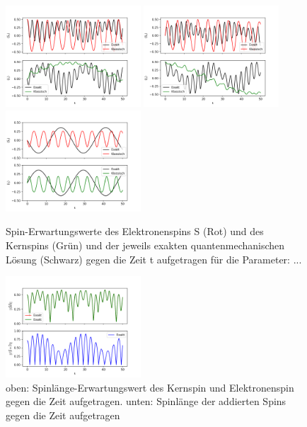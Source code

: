 \begin{figure}[h]
    \centering
    \includegraphics[width = 0.45\textwidth]{Abbildungen/Plot_Sx.png}
    \includegraphics[width = 0.45\textwidth]{Abbildungen/Plot_Sy.png}
    \includegraphics[width = 0.45\textwidth]{Abbildungen/Plot_Sz.png}
    \caption{Spin-Erwartungswerte des Elektronenspins S (Rot) und des Kernspins (Grün) und der jeweils exakten quantenmechanischen Lösung
    (Schwarz) gegen die Zeit t aufgetragen für die Parameter: ...}
    \label{fig:Plots_2D}
\end{figure}

\begin{figure}[h]
    \centering
    \includegraphics[width = 0.45\textwidth]{Abbildungen/Plot_Spin_length.png}
    \caption{oben: Spinlänge-Erwartungswert des Kernspin und Elektronenspin gegen die Zeit aufgetragen.
    unten: Spinlänge der addierten Spins gegen die Zeit aufgetragen}
    \label{fig:Plots_Spinlength}
\end{figure}


